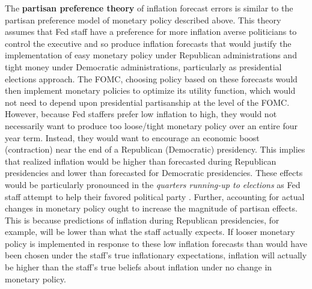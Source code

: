 \documentclass[a4paper]{article}\usepackage{graphicx, color}
\begin{document}
The {\bf{partisan preference theory}} of inflation forecast errors is similar to the partisan preference model of monetary policy described above. This theory assumes that Fed staff have a preference for more inflation averse politicians to control the executive and so produce inflation forecasts that would justify the implementation of easy monetary policy under Republican administrations and tight money under Democratic administrations, particularly as presidential elections approach. The FOMC, choosing policy based on these forecasts would then implement monetary policies to optimize its utility function, which would not need to depend upon presidential partisanship at the level of the FOMC. However, because Fed staffers prefer low inflation to high, they would not necessarily want to produce too loose/tight monetary policy over an entire four year term. Instead, they would want to encourage an economic boost (contraction) near the end of a Republican (Democratic) presidency. This implies that realized inflation would be higher than forecasted during Republican presidencies and lower than forecasted for Democratic presidencies. These effects would be particularly pronounced in the {\emph{quarters running-up to elections}} as Fed staff attempt to help their favored political party \citep{Beck1987,Grier1987}. Further, accounting for actual changes in monetary policy ought to increase the magnitude of partisan effects. This is because predictions of inflation during Republican presidencies, for example, will be lower than what the staff actually expects. If looser monetary policy is implemented in response to these low inflation forecasts than would have been chosen under the staff's true inflationary expectations, inflation will actually be higher than the staff's true beliefs about inflation under no change in monetary policy.
\end{document}
